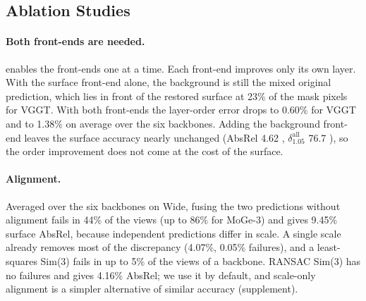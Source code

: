 \subsection{Ablation Studies}
\label{sec:exp-analysis}

\paragraph{Both front-ends are needed.}
 enables the front-ends one at a time.
Each front-end improves only its own layer.
With the surface front-end alone, the background is still the mixed original prediction, which lies in front of the restored surface at 23\% of the mask pixels for VGGT.
With both front-ends the layer-order error drops to 0.60\% for VGGT and to 1.38\% on average over the six backbones.
Adding the background front-end leaves the surface accuracy nearly unchanged (AbsRel 4.62 , $\delta^{\mathrm{all}}_{1.05}$ 76.7 ), so the order improvement does not come at the cost of the surface.

\paragraph{Alignment.}
Averaged over the six backbones on Wide, fusing the two predictions without alignment fails in 44\% of the views (up to 86\% for MoGe-3) and gives 9.45\% surface AbsRel, because independent predictions differ in scale.
A single scale already removes most of the discrepancy (4.07\%, 0.05\% failures), and a least-squares Sim(3) fails in up to 5\% of the views of a backbone.
RANSAC Sim(3) has no failures and gives 4.16\% AbsRel; we use it by default, and scale-only alignment is a simpler alternative of similar accuracy (supplement).

